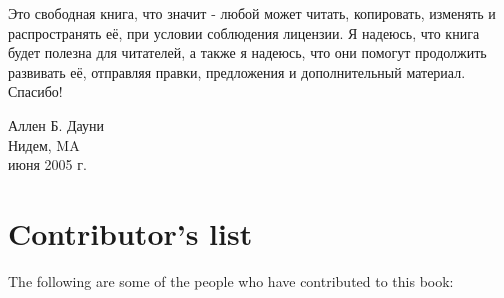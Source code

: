 Это свободная книга, что значит - любой может читать, копировать,
изменять и распространять её, при условии соблюдения лицензии.
Я надеюсь, что книга будет полезна для читателей, а также я надеюсь, что
они помогут продолжить развивать её, отправляя правки, предложения
и дополнительный материал.
Спасибо!

\vspace{0.3in}

\noindent Аллен Б. Дауни \\
\noindent Нидем, MA \\
 июня 2005 г. \\


\section*{Contributor's list}

The following are some of the people who have contributed to this
book:

